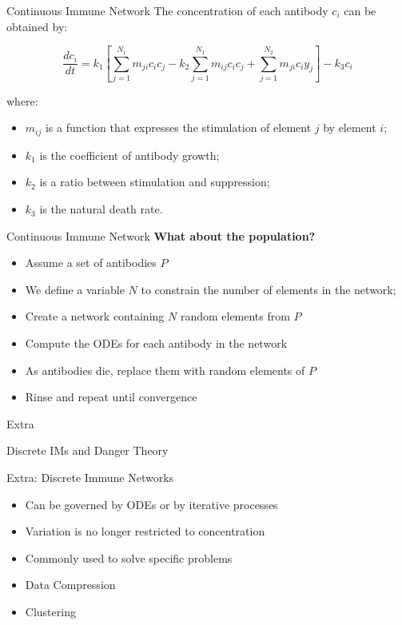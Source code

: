 \documentclass[xcolor=svgnames]{beamer}
\newcommand{\introframe}[2]{
    \begin{frame}
       \vfill
       \hfill\Huge{#1}
       
       \vspace{1em}
       
       \hfill\Large{#2}
       \vfill
    \end{frame}
}
\begin{document}
    \begin{frame}{Continuous Immune Network}
        The concentration of each antibody $c_{i}$ can be obtained by:
        
        $$ \frac{dc_{i}}{dt} = k_{1} \left[ \sum^{N_{1}}_{j=1}{m_{ji}c_{i}c_{j}} - k_{2} \sum^{N_{1}}_{j=1}{m_{ij}c_{i}c_{j}} + \sum^{N_{2}}_{j=1}{m_{ji}c_{i}y_{j}} \right] - k_{3}c_{i} $$
        
        where:
        
        \begin{itemize}
            \item $m_{ij}$ is a function that expresses the stimulation of element $j$ by element $i$;
            \item $k_{1}$ is the coefficient of antibody growth;
            \item $k_{2}$ is a ratio between stimulation and suppression;
            \item $k_{3}$ is the natural death rate.
        \end{itemize}
    \end{frame}
    
    \begin{frame}{Continuous Immune Network}
        \textbf{What about the population?}
        \pause
        
        \vspace{1em}
        \begin{itemize}
            \item Assume a set of antibodies $P$
            \item We define a variable $N$ to constrain the number of elements in the network;
            \item Create a network containing $N$ random elements from $P$
            \item Compute the ODEs for each antibody in the network
            \item As antibodies die, replace them with random elements of $P$
            \item Rinse and repeat until convergence
        \end{itemize}
    \end{frame}
    
    \introframe{Extra}{Discrete IMs and Danger Theory}
    
    \begin{frame}{Extra: Discrete Immune Networks}
        \begin{itemize}
            \item Can be governed by ODEs or by iterative processes
            \item Variation is no longer restricted to concentration
            \item Commonly used to solve specific problems
            \item Data Compression 
            \item Clustering
        \end{itemize}
    \end{frame}
    
\end{document}
